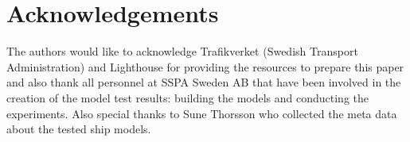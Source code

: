 \section*{Acknowledgements}
\label{se:acknowledgements}
The authors would like to acknowledge Trafikverket (Swedish Transport Administration) and Lighthouse for providing the resources to prepare this paper and also thank all personnel at SSPA Sweden AB that have been involved in the creation of the model test results: building the models and conducting the experiments. Also special thanks to Sune Thorsson who collected the meta data about the tested ship models.




